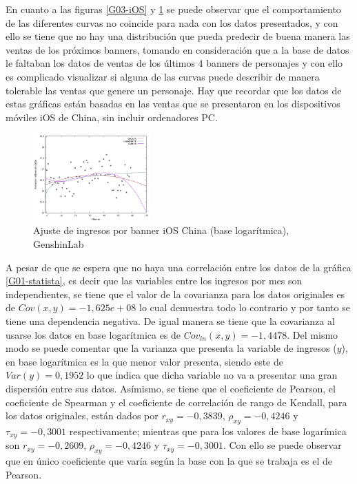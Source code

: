 \documentclass[osajnl,twocolumn,showpacs,superscriptaddress,10pt]{revtex4-2}
\begin{document}
En cuanto a las figuras \ref{G03-iOS} y \ref{G04-iOS} se puede observar que el comportamiento de las diferentes curvas no coincide para nada con los datos presentados, y con ello se tiene que no hay una distribución que pueda predecir de buena manera las ventas de los próximos banners, tomando en consideración que a la base de datos le faltaban los datos de ventas de los últimos 4 banners de personajes y con ello es complicado visualizar si alguna de las curvas puede describir de manera tolerable las ventas que genere un personaje. Hay que recordar que los datos de estas gráficas están basadas en las ventas que se presentaron en los dispositivos móviles iOS de China, sin incluir ordenadores PC.
\begin{figure}[H]
    \begin{center}
        \includegraphics[width=0.4\textwidth]{img/GIBannChRev01.pdf}
        \caption{\label{G04-iOS}Ajuste de ingresos por banner iOS China (base logarítmica), GenshinLab}
    \end{center}
\end{figure}
A pesar de que se espera que no haya una correlación entre los datos de la gráfica \ref{G01-statista}, es decir que las variables entre los ingresos por mes  son independientes, se tiene que el valor de la covarianza para los datos originales es de $Cov(x,y)=-1,625e+08$ lo cual demuestra todo lo contrario y por tanto se tiene una dependencia negativa. De igual manera se tiene que la covarianza al usarse los datos en base logarítmica es de $Cov_{ln}(x,y)=-1,4478$. Del mismo modo se puede comentar que la varianza que presenta la variable de ingresos ($y$), en base logarítmica es la que menor valor presenta, siendo este de $Var(y)=0,1952$ lo que indica que dicha variable no va a presentar una gran dispersión entre sus datos. Asímismo, se tiene que el coeficiente de Pearson, el coeficiente de Spearman y el coeficiente de correlación de rango de Kendall, para los datos originales, están dados por $r_{xy}=-0,3839$, $\rho_{xy}=-0,4246$ y $\tau_{xy}=-0,3001$ respectivamente; mientras que para los valores de base logarímica son $r_{xy}=-0,2609$, $\rho_{xy}=-0,4246$ y $\tau_{xy}=-0,3001$. Con ello se puede observar que en único coeficiente que varía según la base con la que se trabaja es el de Pearson. 
\end{document}
